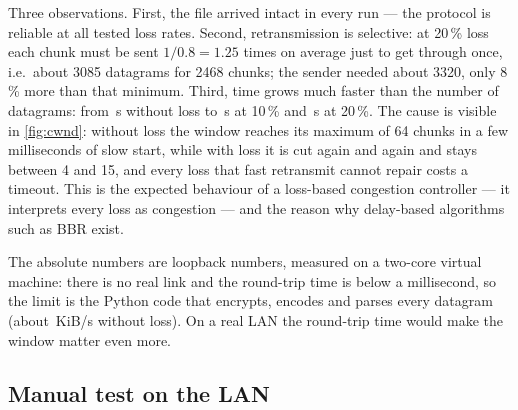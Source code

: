 


Three observations. First, the file arrived intact in every run --- the protocol is reliable at all
tested loss rates. Second, retransmission is selective: at 20\,\% loss each chunk must be sent
$1/0.8 = 1.25$ times on average just to get through once, i.e.\ about 3085 datagrams for 2468
chunks; the sender needed about 3320, only 8\,\% more than that minimum. Third, time grows much faster
than the number of datagrams: from \FactBenchZero{}\,s without loss to \FactBenchTen{}\,s at 10\,\%
and \FactBenchTwenty{}\,s at 20\,\%. The cause is visible in \cref{fig:cwnd}: without loss the window
reaches its maximum of 64 chunks in a few milliseconds of slow start, while with loss it is cut again
and again and stays between 4 and 15, and every loss that fast retransmit cannot repair costs a
timeout. This is the expected behaviour of a loss-based congestion controller --- it interprets
every loss as congestion --- and the reason why delay-based algorithms such as BBR exist.


The absolute numbers are loopback numbers, measured on a two-core virtual machine: there is no real
link and the round-trip time is below a millisecond, so the limit is the Python code that encrypts,
encodes and parses every datagram (about \FactKibZero{}\,KiB/s without loss). On a real LAN the
round-trip time would make the window matter even more.

\subsection{Manual test on the LAN}
